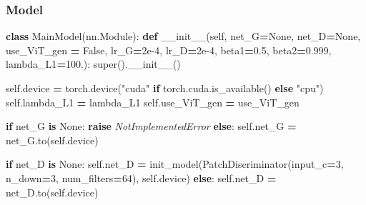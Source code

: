 \documentclass[
]{article}
\newenvironment{Shaded}{\begin{snugshade}}{\end{snugshade}}
\newcommand{\BuiltInTok}[1]{#1}
\newcommand{\ControlFlowTok}[1]{\textcolor[rgb]{0.13,0.29,0.53}{\textbf{#1}}}
\newcommand{\DecValTok}[1]{\textcolor[rgb]{0.00,0.00,0.81}{#1}}
\newcommand{\FloatTok}[1]{\textcolor[rgb]{0.00,0.00,0.81}{#1}}
\newcommand{\FunctionTok}[1]{\textcolor[rgb]{0.00,0.00,0.00}{#1}}
\newcommand{\KeywordTok}[1]{\textcolor[rgb]{0.13,0.29,0.53}{\textbf{#1}}}
\newcommand{\NormalTok}[1]{#1}
\newcommand{\OperatorTok}[1]{\textcolor[rgb]{0.81,0.36,0.00}{\textbf{#1}}}
\newcommand{\PreprocessorTok}[1]{\textcolor[rgb]{0.56,0.35,0.01}{\textit{#1}}}
\newcommand{\StringTok}[1]{\textcolor[rgb]{0.31,0.60,0.02}{#1}}
\newcommand{\VariableTok}[1]{\textcolor[rgb]{0.00,0.00,0.00}{#1}}
\begin{document}
\hypertarget{model}{%
\subsubsection{Model}\label{model}}

\begin{Shaded}
\begin{Highlighting}[]
\KeywordTok{class}\NormalTok{ MainModel(nn.Module):}
    \KeywordTok{def} \FunctionTok{\_\_init\_\_}\NormalTok{(}\VariableTok{self}\NormalTok{, net\_G}\OperatorTok{=}\VariableTok{None}\NormalTok{, net\_D}\OperatorTok{=}\VariableTok{None}\NormalTok{, use\_ViT\_gen }\OperatorTok{=} \VariableTok{False}\NormalTok{, lr\_G}\OperatorTok{=}\FloatTok{2e{-}4}\NormalTok{, lr\_D}\OperatorTok{=}\FloatTok{2e{-}4}\NormalTok{, }
\NormalTok{                 beta1}\OperatorTok{=}\FloatTok{0.5}\NormalTok{, beta2}\OperatorTok{=}\FloatTok{0.999}\NormalTok{, lambda\_L1}\OperatorTok{=}\FloatTok{100.}\NormalTok{):}
        \BuiltInTok{super}\NormalTok{().}\FunctionTok{\_\_init\_\_}\NormalTok{()}
        
        \VariableTok{self}\NormalTok{.device }\OperatorTok{=}\NormalTok{ torch.device(}\StringTok{"cuda"} \ControlFlowTok{if}\NormalTok{ torch.cuda.is\_available() }\ControlFlowTok{else} \StringTok{"cpu"}\NormalTok{)}
        \VariableTok{self}\NormalTok{.lambda\_L1 }\OperatorTok{=}\NormalTok{ lambda\_L1}
        \VariableTok{self}\NormalTok{.use\_ViT\_gen }\OperatorTok{=}\NormalTok{ use\_ViT\_gen}
        
        \ControlFlowTok{if}\NormalTok{ net\_G }\KeywordTok{is} \VariableTok{None}\NormalTok{:}
            \ControlFlowTok{raise} \PreprocessorTok{NotImplementedError}
        \ControlFlowTok{else}\NormalTok{:}
            \VariableTok{self}\NormalTok{.net\_G }\OperatorTok{=}\NormalTok{ net\_G.to(}\VariableTok{self}\NormalTok{.device)}
        
        \ControlFlowTok{if}\NormalTok{ net\_D }\KeywordTok{is} \VariableTok{None}\NormalTok{:}
            \VariableTok{self}\NormalTok{.net\_D }\OperatorTok{=}\NormalTok{ init\_model(PatchDiscriminator(input\_c}\OperatorTok{=}\DecValTok{3}\NormalTok{, n\_down}\OperatorTok{=}\DecValTok{3}\NormalTok{, num\_filters}\OperatorTok{=}\DecValTok{64}\NormalTok{), }\VariableTok{self}\NormalTok{.device)}
        \ControlFlowTok{else}\NormalTok{:}
            \VariableTok{self}\NormalTok{.net\_D }\OperatorTok{=}\NormalTok{ net\_D.to(}\VariableTok{self}\NormalTok{.device)}
            

\end{Highlighting}
\end{Shaded}
\end{document}
